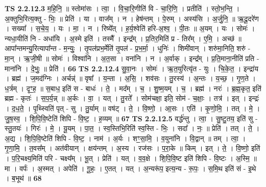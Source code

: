 \documentclass[17pt]{extarticle}
\begin{document}
                  \newline
                                \textbf{ TS 2.2.12.3} \newline
                  म॒हि॒नि॒ ॥ स्तोमा॑सः । त्वा॒ । वि॒चा॒रि॒णीति॑ वि - चा॒रि॒णि॒ । प्रतीति॑ । स्तो॒भ॒न्ति॒ । अ॒क्तुभि॒रित्य॒क्तु - भिः॒ ॥ प्रेति॑ । या । वाज᳚म् । न । हेष॑न्तम् । पे॒रुम् । अस्य॑सि । अ॒र्जु॒नि॒ ॥ ऋ॒दू॒दरे॑ण । सख्या᳚ । स॒चे॒य॒ । यः । मा॒ । न । रिष्ये᳚त् । ह॒र्य॒श्वेति॑ हरि-अ॒श्व॒ । पी॒तः ॥ अ॒यम् । यः । सोमः॑ । न्यधा॒यीति॑ नि - अधा॑यि । अ॒स्मे इति॑ । तस्मै᳚ । इन्द्र᳚म् । प्र॒तिर॒मिति॑ प्र - तिर᳚म् । ए॒मि॒ । अच्छ॑ ॥ आपा᳚न्तमन्यु॒रित्यापा᳚न्त - म॒न्युः॒ । तृ॒पल॑प्रभ॒र्मेति॑ तृ॒पल॑ - प्र॒भ॒र्मा॒ । धुनिः॑ । शिमी॑वान् । शरु॑मा॒निति॒ शरु॑ - मा॒न् । ऋ॒जी॒षी ॥ सोमः॑ । विश्वा॑नि । अ॒त॒सा । वना॑नि । न । अ॒र्वाक् । इन्द्र᳚म् । प्र॒ति॒माना॒नीति॑ प्रति - माना॑नि । दे॒भुः॒ ॥ प्रेति॑ । \textbf{  66} \newline
                  \newline
                                \textbf{ TS 2.2.12.4} \newline
                  सु॒वा॒नः । सोमः॑ । ऋ॒त॒युरित्यृ॑त - युः । चि॒के॒त॒ । इन्द्रा॑य । ब्रह्म॑ । ज॒मद॑ग्निः । अर्चन्न्॑ ॥ वृषा᳚ । य॒न्ता । अ॒सि॒ । शव॑सः । तु॒रस्य॑ । अ॒न्तः । य॒च्छ॒ । गृ॒ण॒ते । ध॒र्त्रम् । दृꣳ॒॒ह॒ ॥ स॒बाध॒ इति॑ स - बाधः॑ । ते॒ । मद᳚म् । च॒ । शु॒ष्म॒यम् । च॒ । ब्रह्म॑ । नरः॑ । ब्र॒ह्म॒कृत॒ इति॑ ब्रह्म - कृतः॑ । स॒प॒र्य॒न्न् ॥ अ॒र्कः । वा॒ । यत् । तु॒रते᳚ । सोम॑चक्षा॒ इति॒ सोम॑ - च॒क्षाः॒ । तत्र॑ । इत् । इन्द्रः॑ । द॒ध॒ते॒ । पृ॒थ्स्विति॑ पृत् - सु । तु॒र्याम् ॥ वष॑ट् । ते॒ । वि॒ष्णो॒ । आ॒सः । एति॑ । कृ॒णो॒मि॒ । तत् । मे॒ । जु॒ष॒स्व॒ । शि॒पि॒वि॒ष्टेति॑ शिपि - वि॒ष्ट॒ । ह॒व्यम् ॥ \textbf{  67} \newline
                  \newline
                                \textbf{ TS 2.2.12.5} \newline
                  वर्द्ध॑न्तु । त्वा॒ । सु॒ष्टु॒तय॒ इति॑ सु - स्तु॒तयः॑ । गिरः॑ । मे॒ । यू॒यम् । पा॒त॒ । स्व॒स्तिभि॒रिति॑ स्व॒स्ति - भिः॒ । सदा᳚ । नः॒ ॥ प्रेति॑ । तत् । ते॒ । अ॒द्य । शि॒पि॒वि॒ष्टेति॑ शिपि - वि॒ष्ट॒ । नाम॑ । अ॒र्यः । शꣳ॒॒सा॒मि॒ । व॒युना॑नि । वि॒द्वान् ॥ तम् । त्वा॒ । गृ॒णा॒मि॒ । त॒वस᳚म् । अत॑वीयान् । क्षय॑न्तम् । अ॒स्य । रज॑सः । प॒रा॒के ॥ किम् । इत् । ते॒ । वि॒ष्णो॒ इति॑ । प॒रि॒चक्ष्य॒मिति॑ परि - चक्ष्य᳚म् । भू॒त् । प्रेति॑ । यत् । व॒व॒क्षे । शि॒पि॒वि॒ष्ट इति॑ शिपि - वि॒ष्टः । अ॒स्मि॒ ॥ मा । वर्पः॑ । अ॒स्मत् । अपेति॑ । गू॒हः॒ । ए॒तत् । यत् । अ॒न्यरू॑प॒ इत्य॒न्य - रू॒पः॒ । स॒मि॒थ इति॑ सं - इ॒थे । ब॒भूथ॑ ॥ \textbf{  68} \newline
\end{document}
